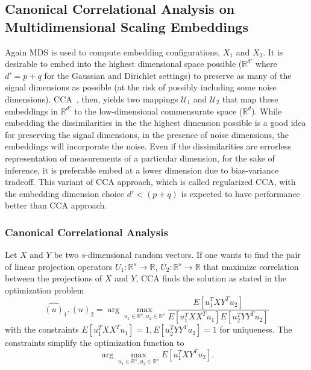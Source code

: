 \documentclass[11pt]{article} %
\begin{document}
\subsection{Canonical Correlational  Analysis on Multidimensional Scaling Embeddings} 

Again MDS is used  to compute embedding configurations, $ X_1$ and $X_2$. It is desirable to  embed into the highest dimensional space  possible ($\mathbb{R}^{d'}$ where $d'=p+q$ for the Gaussian and Dirichlet settings)  to  preserve as many of the signal dimensions as possible (at the risk of possibly including  some noise dimensions). CCA~\cite{Hardoon2004}, then,  yields two mappings $\mathcal{U}_1$ and $\mathcal{U}_2$ that map these embeddings in $\mathbb{R}^{d'}$ to  the low-dimensional commensurate space ($\mathbb{R}^d$). 
While embedding the dissimilarities in the the highest dimension possible is a good idea for preserving the signal dimensions, in the presence of noise dimensions, the embeddings will incorporate the noise. Even if the dissimilarities are errorless representation of measurements of a particular dimension, for  the  sake of inference, it is preferable  embed at a lower  dimension due to bias-variance tradeoff. This variant of CCA approach, which is called regularized CCA, with the  embedding dimension choice $d'< (p+q)$ is expected to have performance better than CCA approach.

\subsubsection*{Canonical Correlational Analysis}

 Let $X$ and $Y$ be two $s$-dimensional random vectors. If  one wants to find  the pair of linear projection operators $U_1:\mathbb{R}^s \rightarrow  \mathbb{R}$, $U_2 :\mathbb{R}^s \rightarrow  \mathbb{R}$ that maximize correlation between the projections of   $X$ and $Y$, CCA finds the solution as stated in the  optimization problem
$$
{\hat{(u)}_1 ,\hat{(u)}_2}=\arg\max_{u_1\in\mathbb{R}^s,u_2\in\mathbb{R}^s} {\frac{E[u_1^{T}XY^Tu_2]}{{E[u_1^{T}XX^T u_1]}{E[u_2^{T}YY^T u_2]}}}$$
with the constraints $E[{u_1^{T}XX^T u_1}]=1 , E[{u_2^{T}YY^T u_2}]=1$ for uniqueness. The constraints simplify the optimization function to $$
\arg\max_{u_1\in \mathbb{R}^s,u_2\in \mathbb{R}^s} {E[u_1^{T}XY^Tu_2]}.$$
\end{document}

